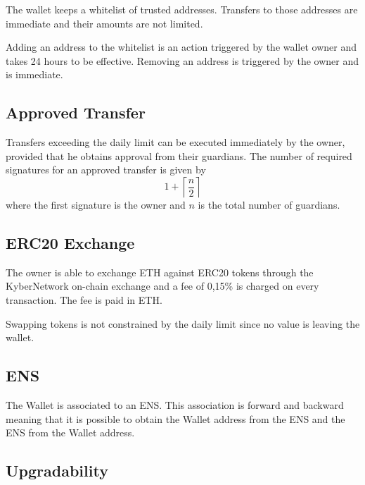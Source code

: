 \documentclass[12pt]{article}
\begin{document}
The wallet keeps a whitelist of trusted addresses. Transfers to those addresses are immediate and their amounts are not limited.

Adding an address to the whitelist is an action triggered by the wallet owner and takes 24 hours to be effective. Removing an address is triggered by the owner and is immediate.

\subsection{Approved Transfer}
\label{sec:approved-transfer}

Transfers exceeding the daily limit can be executed immediately by the owner, provided that he obtains approval from their guardians. The number of required signatures for an approved transfer is given by
\begin{equation*}
    1+\left\lceil {\frac{n}{2}} \right\rceil
\end{equation*}
where the first signature is the owner and $n$ is the total number of guardians.

\subsection{ERC20 Exchange}

The owner is able to exchange ETH against ERC20 tokens through the KyberNetwork on-chain exchange and a fee of 0,15\% is charged on every transaction. The fee is paid in ETH. 

Swapping tokens is not constrained by the daily limit since no value is leaving the wallet.

\subsection{ENS}

The Wallet is associated to an ENS. This association is forward and backward meaning that it is possible to obtain the Wallet address from the ENS and the ENS from the Wallet address.

\subsection{Upgradability}
\end{document}
